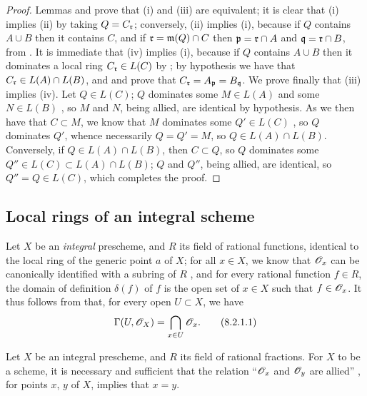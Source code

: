 \begin{proof}
\label{proof-1.8.1.5}
Lemmas  and  prove that (i) and (iii) are equivalent; it
is clear that (i) implies (ii) by taking $Q=C_\mathfrak{r}$; conversely, (ii)
implies (i), because if $Q$ contains $A\cup B$ then it contains $C$, and if
$\mathfrak{r}=\mathfrak{m}(Q)\cap C$ then $\mathfrak{p}=\mathfrak{r}\cap A$ and
$\mathfrak{q}=\mathfrak{r}\cap B$, from . It is immediate that (iv)
implies (i), because if $Q$ contains $A\cup B$ then it dominates a local ring
$C_\mathfrak{r}\in L(C)$ by ; by hypothesis we have that
$C_\mathfrak{r}\in L(A)\cap L(B)$, and  and  prove that
$C_\mathfrak{r}=A_\mathfrak{p}=B_\mathfrak{q}$. We prove finally that (iii)
implies (iv). Let $Q\in L(C)$; $Q$ dominates some $M\in L(A)$ and some $N\in
L(B)$ , so $M$ and $N$, being allied, are identical by hypothesis.
As we then have that $C\subset M$, we know that $M$ dominates some $Q'\in L(C)$
, so $Q$ dominates $Q'$, whence necessarily  $Q=Q'=M$,
so $Q\in L(A)\cap L(B)$. Conversely, if $Q\in L(A)\cap L(B)$, then $C\subset
Q$, so  $Q$ dominates some $Q''\in L(C)\subset L(A)\cap L(B)$; $Q$
and $Q''$, being allied, are identical, so $Q''=Q\in L(C)$, which completes the
proof.
\end{proof}

\subsection{Local rings of an integral scheme}
\label{subsection-local-rings-of-integral-scheme}

\begin{env}[8.2.1]
\label{1.8.2.1}
Let $X$ be an {\em integral} prescheme, and $R$ its field of
rational functions, identical to the local ring of the generic point $a$ of $X$;
for all $x\in X$, we know that $\mathscr{O}_x$ can be canonically identified with a
subring of $R$ , and for every rational function $f\in R$, the
domain of definition $\delta(f)$ of $f$ is the open set of $x\in X$ such that
$f\in\mathscr{O}_x$. It thus follows from  that, for every open $U\subset X$,
we have
\[
  \Gamma(U,\mathscr{O}_X)=\bigcap_{x\in U}\mathscr{O}_x.
  \tag{8.2.1.1}
\]
\end{env}

\begin{prop}[8.2.2]
\label{1.8.2.2}
Let $X$ be an integral prescheme,
and $R$ its field of rational fractions. For $X$ to be a scheme, it is
necessary and sufficient that the relation ``$\mathscr{O}_x$ and $\mathscr{O}_y$ are allied''
, for points $x$, $y$ of $X$, implies that $x=y$.
\end{prop}

